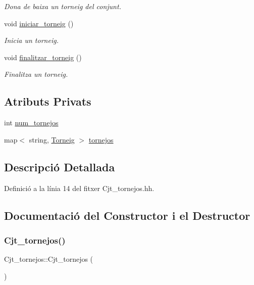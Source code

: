 \begin{DoxyCompactItemize}
\begin{DoxyCompactList}\small\item\em Dona de baixa un torneig del conjunt. \end{DoxyCompactList}\item 
void \mbox{\hyperlink{class_cjt__tornejos_a2c25098715760c57d0eb2bd1acc02eae}{iniciar\+\_\+torneig}} ()
\begin{DoxyCompactList}\small\item\em Inicia un torneig. \end{DoxyCompactList}\item 
void \mbox{\hyperlink{class_cjt__tornejos_ac12030fc4c0f063b54d62515f0b818b7}{finalitzar\+\_\+torneig}} ()
\begin{DoxyCompactList}\small\item\em Finalitza un torneig. \end{DoxyCompactList}\end{DoxyCompactItemize}
\subsection*{Atributs Privats}
\begin{DoxyCompactItemize}
\item 
int \mbox{\hyperlink{class_cjt__tornejos_afe968dc02bf4f83842c53c5a76182f2f}{num\+\_\+tornejos}}
\item 
map$<$ string, \mbox{\hyperlink{class_torneig}{Torneig}} $>$ \mbox{\hyperlink{class_cjt__tornejos_a4b3d9bdd2ed133d76284fb510ebe9800}{tornejos}}
\end{DoxyCompactItemize}


\subsection{Descripció Detallada}


Definició a la línia 14 del fitxer Cjt\+\_\+tornejos.\+hh.



\subsection{Documentació del Constructor i el Destructor}
\mbox{\label{class_cjt__tornejos_a802f937a72b37c2a675734cb3d6f6257}} 
\subsubsection{\texorpdfstring{Cjt\+\_\+tornejos()}{Cjt\_tornejos()}}
{\footnotesize\ttfamily Cjt\+\_\+tornejos\+::\+Cjt\+\_\+tornejos (\begin{DoxyParamCaption}{ }\end{DoxyParamCaption})}



